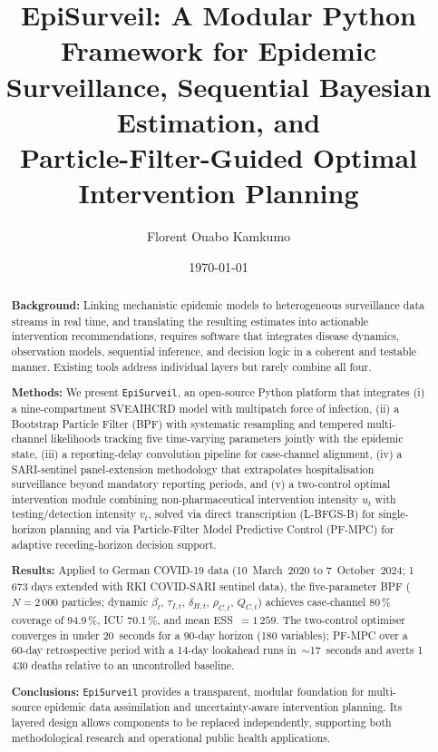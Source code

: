 \documentclass[11pt]{article}
\title{EpiSurveil: A Modular Python Framework for Epidemic\\
       Surveillance, Sequential Bayesian Estimation, and\\
       Particle-Filter-Guided Optimal Intervention Planning}
\author{Florent Ouabo Kamkumo}
\date{\today}
\begin{document}
\maketitle

\begin{abstract}
\textbf{Background:}
Linking mechanistic epidemic models to heterogeneous surveillance data
streams in real time, and translating the resulting estimates into
actionable intervention recommendations, requires software that integrates
disease dynamics, observation models, sequential inference, and
decision logic in a coherent and testable manner.
Existing tools address individual layers but rarely combine all four.

\textbf{Methods:}
We present \texttt{EpiSurveil}, an open-source Python platform that integrates
(i) a nine-compartment SVEAIHCRD model with multipatch force of infection,
(ii) a Bootstrap Particle Filter (BPF) with systematic resampling and
     tempered multi-channel likelihoods tracking five time-varying parameters
     jointly with the epidemic state,
(iii) a reporting-delay convolution pipeline for case-channel alignment,
(iv) a SARI-sentinel panel-extension methodology that extrapolates
     hospitalisation surveillance beyond mandatory reporting periods, and
(v) a two-control optimal intervention module combining
    non-pharmaceutical intervention intensity $u_t$ with testing/detection
    intensity $v_t$, solved via direct transcription (L-BFGS-B) for
    single-horizon planning and via Particle-Filter Model Predictive
    Control (PF-MPC) for adaptive receding-horizon decision support.

\textbf{Results:}
Applied to German COVID-19 data (10~March~2020 to 7~October~2024;
1\,673 days extended with RKI COVID-SARI sentinel data),
the five-parameter BPF ($N=2\,000$ particles;
dynamic $\beta_t$, $\tau_{I,t}$, $\delta_{H,t}$, $\rho_{C,t}$, $Q_{C,t}$)
achieves case-channel 80\,\% coverage of 94.9\,\%, ICU 70.1\,\%, and
mean ESS~$=1\,259$.
The two-control optimiser converges in under 20~seconds for a 90-day horizon
(180 variables); PF-MPC over a 60-day retrospective period with a
14-day lookahead runs in~$\sim$17~seconds and averts 1\,430 deaths
relative to an uncontrolled baseline.

\textbf{Conclusions:}
\texttt{EpiSurveil} provides a transparent, modular foundation for
multi-source epidemic data assimilation and uncertainty-aware intervention
planning.
Its layered design allows components to be replaced independently, supporting
both methodological research and operational public health applications.
\end{abstract}
\end{document}
